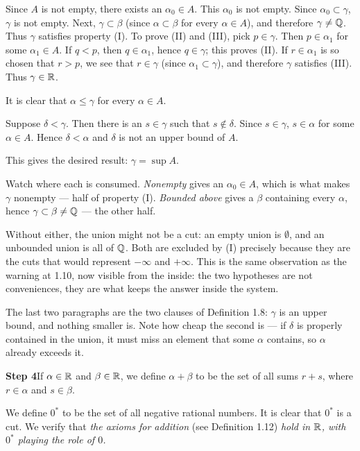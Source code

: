 Since $A$ is not empty, there exists an $\alpha_0 \in A$. This $\alpha_0$ is not
empty. Since $\alpha_0 \subset \gamma$, $\gamma$ is not empty. Next,
$\gamma \subset \beta$ (since $\alpha \subset \beta$ for every $\alpha \in A$),
and therefore $\gamma \ne \mathbb{Q}$. Thus $\gamma$ satisfies property (I). To prove
(II) and (III), pick $p \in \gamma$. Then $p \in \alpha_1$ for some
$\alpha_1 \in A$. If $q < p$, then $q \in \alpha_1$, hence $q \in \gamma$; this
proves (II). If $r \in \alpha_1$ is so chosen that $r > p$, we see that
$r \in \gamma$ (since $\alpha_1 \subset \gamma$), and therefore $\gamma$
satisfies (III). Thus $\gamma \in \mathbb{R}$.

It is clear that $\alpha \le \gamma$ for every $\alpha \in A$.

Suppose $\delta < \gamma$. Then there is an $s \in \gamma$ such that
$s \notin \delta$. Since $s \in \gamma$, $s \in \alpha$ for some $\alpha \in A$.
Hence $\delta < \alpha$ and $\delta$ is not an upper bound of $A$.

This gives the desired result: $\gamma = \sup A$.

\begin{deeper}
Watch where each is consumed. \emph{Nonempty} gives an $\alpha_0 \in A$, which
is what makes $\gamma$ nonempty --- half of property (I). \emph{Bounded above}
gives a $\beta$ containing every $\alpha$, hence $\gamma \subset \beta \ne \mathbb{Q}$
--- the other half.

Without either, the union might not be a cut: an empty union is $\emptyset$, and
an unbounded union is all of $\mathbb{Q}$. Both are excluded by (I) precisely because
they are the cuts that would represent $-\infty$ and $+\infty$. This is the same
observation as the warning at 1.10, now visible from the inside: the two
hypotheses are not conveniences, they are what keeps the answer inside the
system.

The last two paragraphs are the two clauses of Definition 1.8: $\gamma$ is an
upper bound, and nothing smaller is. Note how cheap the second is --- if
$\delta$ is properly contained in the union, it must miss an element that some
$\alpha$ contains, so $\alpha$ already exceeds it.
\end{deeper}

\medskip
\noindent\textbf{Step 4}\quad If $\alpha \in \mathbb{R}$ and $\beta \in \mathbb{R}$, we define
$\alpha + \beta$ to be the set of all sums $r+s$, where $r \in \alpha$ and
$s \in \beta$.

We define $0^*$ to be the set of all negative rational numbers. It is clear that
$0^*$ is a cut. We verify that \emph{the axioms for addition} (see Definition
1.12) \emph{hold in $\mathbb{R}$, with $0^*$ playing the role of $0$.}

